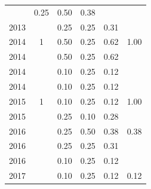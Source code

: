 \begin{table}[H]
\begin{tabular}{| l | c | c | c | c | c |}
          &
          0.25
          &
          0.50
          &
          0.38
          &
          \\
            2013
          &
          
          &
          0.25
          &
          0.25
          &
          0.31
          &
          \\
\hline
            2014
          &
          1
          &
          0.50
          &
          0.25
          &
          0.62
          &
            {\color{blue} 1.00}
          \\
            2014
          &
          
          &
          0.50
          &
          0.25
          &
          0.62
          &
          \\
            2014
          &
          
          &
          0.10
          &
          0.25
          &
          0.12
          &
          \\
            2014
          &
          
          &
          0.10
          &
          0.25
          &
          0.12
          &
          \\
\hline
            2015
          &
          1
          &
          0.10
          &
          0.25
          &
          0.12
          &
            {\color{blue} 1.00}
          \\
            2015
          &
          
          &
          0.25
          &
          0.10
          &
          0.28
          &
          \\
\hline
            2016
          &
          
          &
          0.25
          &
          0.50
          &
          0.38
          &
            {\color{red} 0.38}
          \\
            2016
          &
          
          &
          0.25
          &
          0.25
          &
          0.31
          &
          \\
            2016
          &
          
          &
          0.10
          &
          0.25
          &
          0.12
          &
          \\
\hline
            2017
          &
          
          &
          0.10
          &
          0.25
          &
          0.12
          &
            {\color{red} 0.12}
          \\
\hline
\end{tabular}
\end{table}

